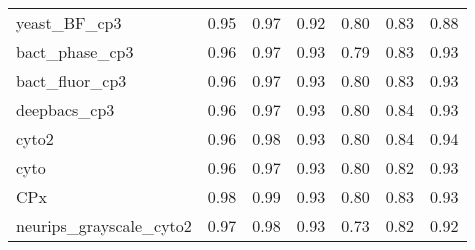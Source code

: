 \documentclass[./dissertation.tex]{subfiles}
\begin{document}
\begin{table}
\begin{tabular}{|l|c|c|c|c|c|c|}
        yeast\_BF\_cp3                            & 0.95                                    & 0.97                                        & 0.92                                    & 0.80                                  & 0.83                                   & 0.88                                    \\
        bact\_phase\_cp3                          & 0.96                                    & 0.97                                        & 0.93                                    & 0.79                                  & 0.83                                   & 0.93                                    \\
        bact\_fluor\_cp3                          & 0.96                                    & 0.97                                        & 0.93                                    & 0.80                                  & 0.83                                   & 0.93                                    \\
        deepbacs\_cp3                             & 0.96                                    & 0.97                                        & 0.93                                    & 0.80                                  & 0.84                                   & 0.93                                    \\
        cyto2                                     & 0.96                                    & 0.98                                        & 0.93                                    & 0.80                                  & 0.84                                   & 0.94                                    \\
        cyto                                      & 0.96                                    & 0.97                                        & 0.93                                    & 0.80                                  & 0.82                                   & 0.93                                    \\
        CPx                                       & 0.98                                    & 0.99                                        & 0.93                                    & 0.80                                  & 0.83                                   & 0.93                                    \\
        neurips\_grayscale\_cyto2                 & 0.97                                    & 0.98                                        & 0.93                                    & 0.73                                  & 0.82                                   & 0.92                                    \\

\end{tabular}
\end{table}
\end{document}
